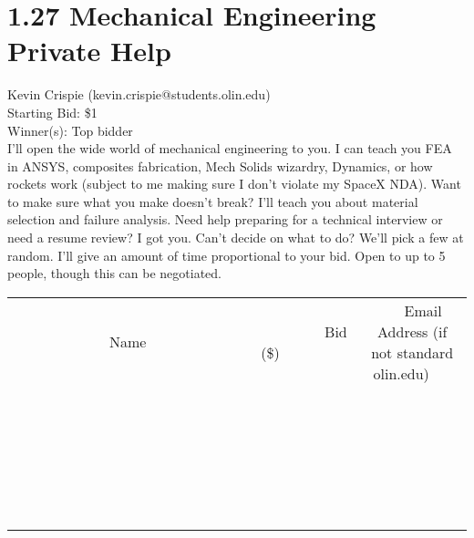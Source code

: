 \documentclass[11pt]{article}
\begin{document}
\section*{1.27 Mechanical Engineering Private Help}
Kevin Crispie (kevin.crispie@students.olin.edu) \\
Starting Bid: \$1 \\
Winner(s): 
Top bidder \\
I’ll open the wide world of mechanical engineering to you. I can teach you FEA in ANSYS, composites fabrication, Mech Solids wizardry, Dynamics, or how rockets work (subject to me making sure I don’t violate my SpaceX NDA). Want to make sure what you make doesn’t break? I’ll teach you about material selection and failure analysis. Need help preparing for a technical interview or need a resume review? I got you. Can’t decide on what to do? We’ll pick a few at random. I’ll give an amount of time proportional to your bid. Open to up to 5 people, though this can be negotiated. \\[6ex]
\begin{tabular}{c c c}
~~~~~~~~~~~~~Name~~~~~~~~~~~~~ & ~~~~~~~~~Bid (\$)~~~~~~~~~ & ~~~Email Address (if not standard olin.edu)~~~ \\
 & & \\
\hline
 & & \\
\hline
 & & \\
\hline
 & & \\
\hline
 & & \\
\hline
 & & \\
\hline
 & & \\
\hline
 & & \\
\hline
 & & \\
\hline
 & & \\
\hline
 & & \\
\hline
 & & \\
\hline
 & & \\
\hline
 & & \\
\hline
 & & \\
\hline
 & & \\
\hline
 & & \\
\hline
 & & \\
\hline
 & & \\
\hline
 & & \\
\hline
 & & \\
\hline
 & & \\
\hline
 & & \\
\hline
 & & \\
\hline
 & & \\
\hline
 & & \\
\hline
\end{tabular}
\clearpage
\end{document}
